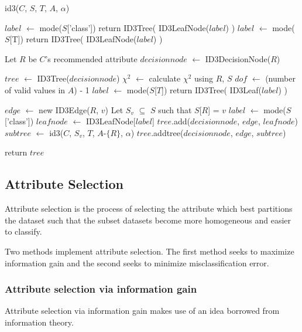 \documentclass{IEEEtran}
\begin{document}
\begin{algorithm}
\label{id3algorithm}
\caption{id3($C$, $S$, $T$, $A$, $\alpha$)}
\begin{algorithmic}
\Statex {}
\Statex {}
\Statex {}
  \State $label$ $\leftarrow$ mode($S$['class'])
  \State return ID3Tree( ID3LeafNode($label$) )
\EndIf
{}
  \State $label$ $\leftarrow$ mode($S$[T])
  \State return ID3Tree( ID3LeafNode($label$) )
\EndIf

\State Let $R$ be $C$'s recommended attribute
\State $decisionnode$ $\leftarrow$ ID3DecisionNode($R$)

\State $tree$ $\leftarrow$ ID3Tree($decisionnode$)
  \State $\chi^2$ $\leftarrow$ calculate $\chi^2$ using $R$, $S$
  \State $dof$ $\leftarrow$ (number of valid values in $A$) - 1
    \State $label$ $\leftarrow$ mode($S$[$T$])
    \State return ID3Tree( ID3Leaf($label$) )
  \EndIf

  \State $edge$ $\leftarrow$ new ID3Edge($R$, $v$)
  \State Let $S_v$ $\subseteq$ $S$ such that $S$[$R$] = $v$
    \State $label$ $\leftarrow$ mode($S$['class'])
    \State $leafnode$ $\leftarrow$ ID3LeafNode[$label$]
    \State $tree$.add($decisionnode$, $edge$, $leafnode$)
  \Else
    \State $subtree$ $\leftarrow$ id3($C$, $S_v$, $T$, $A$-$\lbrace$$R$$\rbrace$, $\alpha$)
    \State $tree$.addtree($decisionnode$, $edge$, $subtree$)
  \EndIf

  return $tree$
\EndFor

\end{algorithmic}
\end{algorithm}


\subsection{Attribute Selection}
Attribute selection is the process of selecting the attribute which
best partitions the dataset such that the subset datasets become more
homogeneous and easier to classify.

Two methods implement attribute selection. The first method seeks to
maximize information gain and the second seeks to minimize
misclassification error.

\subsubsection{Attribute selection via information gain}
Attribute selection via information gain makes use of an idea borrowed
from information theory.
\end{document}
